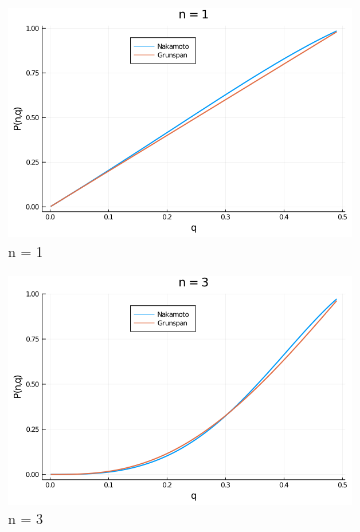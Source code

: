 \documentclass{article}
\begin{document}
        \begin{figure}[H]
            \begin{subfigure}{0.6\textwidth}
                \centering
                \includegraphics[width=\linewidth]{img/n=1.png}
                \caption{n = 1}
            \end{subfigure}
            \begin{subfigure}{0.6\textwidth}
                \centering
                \includegraphics[width=\linewidth]{img/n=3.png}
                \caption{n = 3}
            \end{subfigure}
            \begin{subfigure}{0.6\textwidth}
                \centering

\end{subfigure}
\end{figure}
\end{document}
